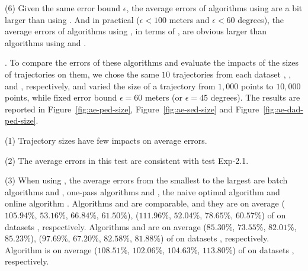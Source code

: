 
\sstab (6) Given the same error bound $\epsilon$, the average errors of algorithms using \sed are a bit larger than using \ped.
And in practical (\eg $\epsilon <100$ meters and $\epsilon < 60$ degrees), the average errors of algorithms using \dad, in terms of \ped, are obvious larger than algorithms using \ped and \sed.


.
To compare the errors of these algorithms and evaluate the impacts of the sizes of trajectories on them, we chose the same $10$ trajectories from each dataset \taxi, \ucar, \geolife and \mopsi, respectively,
and varied the size  of a trajectory from $1,000$ points to $10,000$ points, while fixed error bound $\epsilon = 60$ meters ({or $\epsilon = 45$ degrees}).
The results are reported in Figure~\ref{fig:ae-ped-size}, Figure~\ref{fig:ae-sed-size} and Figure~\ref{fig:ae-dad-ped-size}.

\sstab (1) Trajectory sizes have few impacts on average errors.

\sstab (2) The average errors in this test are consistent with test Exp-2.1.

\sstab (3) {When using \ped,} the average errors from the smallest
to the largest are  batch algorithms \tpa and \dpa,
one-pass algorithms \siped and \operb, the naive optimal algorithm \opt and online algorithm \bqsa.
Algorithms \tpa and \dpa are comparable, and they are on average
{($105.94\%$, $53.16\%$, $66.84\%$, $61.50\%$), ($111.96\%$, $52.04\%$, $78.65\%$, $60.57\%$)} of \opt on datasets \dSets, respectively.
Algorithms \siped and \operb are on average {($85.30\%$, $73.55\%$, $82.01\%$,
  $85.23\%$), ($97.69\%$, $67.20\%$, $82.58\%$, $81.88\%$)}
of \opt on datasets \dSets, respectively.
Algorithm \bqsa is  on average  {($108.51\%$, $102.06\%$, $104.63\%$, $113.80\%$)}
of \opt on datasets \dSets, respectively.




